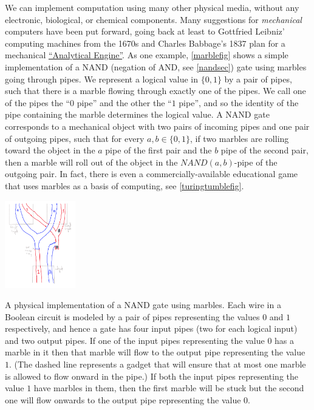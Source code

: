 We can implement computation using many other physical media, without
any electronic, biological, or chemical components. Many suggestions for
\emph{mechanical} computers have been put forward, going back at least
to Gottfried Leibniz' computing machines from the 1670s and Charles
Babbage's 1837 plan for a mechanical
\href{https://en.wikipedia.org/wiki/Analytical_Engine}{``Analytical
Engine''}. As one example, \cref{marblefig} shows a simple
implementation of a NAND (negation of AND, see \cref{nandsec}) gate
using marbles going through pipes. We represent a logical value in
\(\{0,1\}\) by a pair of pipes, such that there is a marble flowing
through exactly one of the pipes. We call one of the pipes the ``\(0\)
pipe'' and the other the ``\(1\) pipe'', and so the identity of the pipe
containing the marble determines the logical value. A NAND gate
corresponds to a mechanical object with two pairs of incoming pipes and
one pair of outgoing pipes, such that for every \(a,b \in \{0,1\}\), if
two marbles are rolling toward the object in the \(a\) pipe of the first
pair and the \(b\) pipe of the second pair, then a marble will roll out
of the object in the \(\ensuremath{\mathit{NAND}}(a,b)\)-pipe of the
outgoing pair. In fact, there is even a commercially-available
educational game that uses marbles as a basis of computing, see
\cref{turingtumblefig}.


\begin{marginfigure}
\centering
\includegraphics[width=\linewidth, height=1.5in, keepaspectratio]{../figure/marble.png}
\caption{A physical implementation of a NAND gate using marbles. Each
wire in a Boolean circuit is modeled by a pair of pipes representing the
values \(0\) and \(1\) respectively, and hence a gate has four input
pipes (two for each logical input) and two output pipes. If one of the
input pipes representing the value \(0\) has a marble in it then that
marble will flow to the output pipe representing the value \(1\). (The
dashed line represents a gadget that will ensure that at most one marble
is allowed to flow onward in the pipe.) If both the input pipes
representing the value \(1\) have marbles in them, then the first marble
will be stuck but the second one will flow onwards to the output pipe
representing the value \(0\).}
\label{marblefig}
\end{marginfigure}


